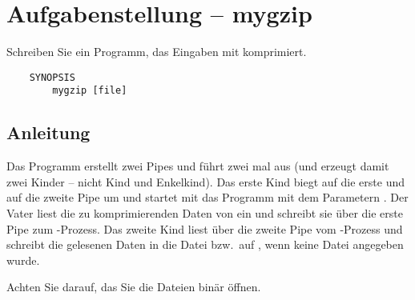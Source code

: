 




\section*{Aufgabenstellung -- mygzip}

Schreiben Sie ein Programm, das Eingaben mit  komprimiert.

\begin{verbatim}
    SYNOPSIS
        mygzip [file]
\end{verbatim}

\subsection*{Anleitung}

Das Programm erstellt zwei Pipes und führt zwei mal  aus (und
erzeugt damit zwei Kinder -- nicht Kind und Enkelkind). Das erste Kind biegt
 auf die erste und  auf die zweite Pipe um
und startet mit  das Programm  mit dem
Parametern . Der Vater liest die zu komprimierenden Daten von
 ein und schreibt sie über die erste Pipe zum
-Prozess. Das zweite Kind liest über die zweite Pipe vom
-Prozess und schreibt die gelesenen Daten in die Datei
 bzw.\ auf , wenn keine Datei angegeben
wurde.

Achten Sie darauf, das Sie die Dateien binär öffnen.

\osueguidelinestwo


